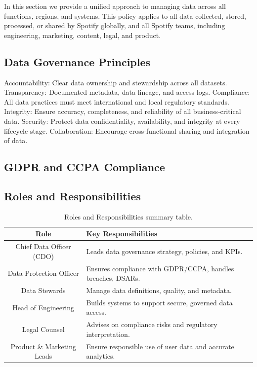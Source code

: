 \documentclass[11pt,a4paper,computermodern]{article}
\begin{document}
In this section we provide a unified approach to managing data across all functions, regions, and systems. This policy applies to all data collected, stored, processed, or shared by Spotify globally, and all Spotify teams, including engineering, marketing, content, legal, and product.


\subsection*{Data Governance Principles}

Accountability: Clear data ownership and stewardship across all datasets.
Transparency: Documented metadata, data lineage, and access logs.
Compliance: All data practices must meet international and local regulatory standards.
Integrity: Ensure accuracy, completeness, and reliability of all business-critical data.
Security: Protect data confidentiality, availability, and integrity at every lifecycle stage.
Collaboration: Encourage cross-functional sharing and integration of data.


\subsection*{GDPR and CCPA Compliance}




\subsection*{Roles and Responsibilities}

\begin{table}[ht]
	\centering
	\begin{threeparttable}
		\caption{Roles and Responsibilities summary table.}
		\label{table:roles}
		\begin{tabularx}{0.99\textwidth}{c >{\centering\arraybackslash}X}
			\toprule
			Role & Key Responsibilities  \\
			\midrule
			Chief Data Officer (CDO) & Leads data governance strategy, policies, and KPIs. \\
			Data Protection Officer & Ensures compliance with GDPR/CCPA, handles breaches, DSARs. \\
			Data Stewards & Manage data definitions, quality, and metadata. \\
			Head of Engineering & Builds systems to support secure, governed data access. \\
			Legal Counsel & Advises on compliance risks and regulatory interpretation. \\
			Product \& Marketing Leads & Ensure responsible use of user data and accurate analytics. \\
			\bottomrule
		\end{tabularx}
	\end{threeparttable}
\end{table}
\end{document}
